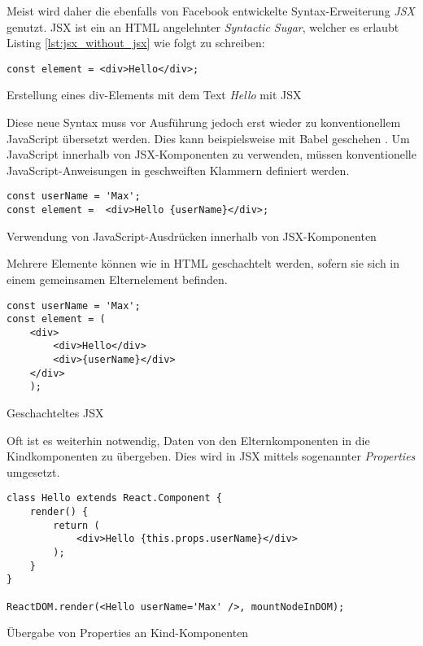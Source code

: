 Meist wird daher die ebenfalls von Facebook entwickelte Syntax-Erweiterung \textit{JSX} genutzt. JSX ist ein an HTML angelehnter \textit{Syntactic Sugar}, welcher es erlaubt Listing \ref{lst:jsx_without_jsx} wie folgt zu schreiben:
\begin{listing}[H]
    \begin{verbatim}
const element = <div>Hello</div>;
    \end{verbatim}
    \caption{Erstellung eines div-Elements mit dem Text \textit{Hello} mit JSX}
    \label{lst:jsx_with_jsx}
\end{listing}
Diese neue Syntax muss vor Ausführung jedoch erst wieder zu konventionellem JavaScript übersetzt werden. Dies kann beispielsweise mit Babel geschehen \cite{facebook_inc._introducing_2016}.
Um JavaScript innerhalb von JSX-Komponenten zu verwenden, müssen konventionelle JavaScript-Anweisungen in geschweiften Klammern definiert werden. 

\begin{listing}[H]
    \begin{verbatim}
const userName = 'Max';
const element =  <div>Hello {userName}</div>;
    \end{verbatim}
    \caption{Verwendung von JavaScript-Ausdrücken innerhalb von JSX-Komponenten}
    \label{lst:embedded_expression}
\end{listing}

Mehrere Elemente können wie in HTML geschachtelt werden, sofern sie sich in einem gemeinsamen Elternelement befinden.

\begin{listing}[H]
    \begin{verbatim}
const userName = 'Max';
const element = (
    <div>
        <div>Hello</div>
        <div>{userName}</div>
    </div>
    );
    \end{verbatim}
    \caption{Geschachteltes JSX}
    \label{lst:jsx_nested}
\end{listing}

Oft ist es weiterhin notwendig, Daten von den Elternkomponenten in die Kindkomponenten zu übergeben. Dies wird in JSX mittels sogenannter \textit{Properties} umgesetzt.

\begin{listing}[H]
    \begin{verbatim}
class Hello extends React.Component {
    render() {
        return (
            <div>Hello {this.props.userName}</div>
        );
    }
}

ReactDOM.render(<Hello userName='Max' />, mountNodeInDOM);
    \end{verbatim}
    \caption{Übergabe von Properties an Kind-Komponenten}
    \label{lst:jsx_nested}
\end{listing}



